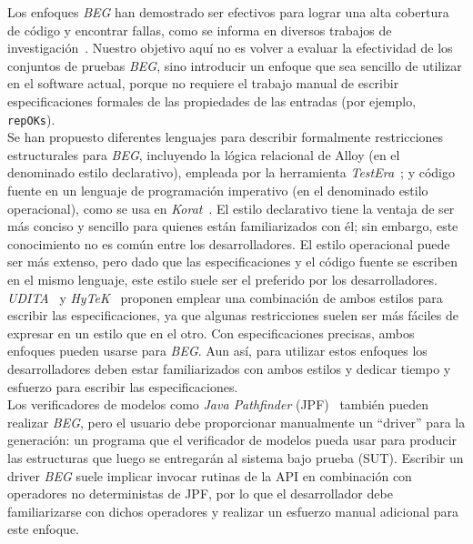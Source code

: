 Los enfoques \textit{BEG} han demostrado ser efectivos para lograr una alta cobertura 
de código y encontrar fallas, como se informa en diversos trabajos de investigación~\cite{ref20,ref16,ref4,ref33}. 
Nuestro objetivo aquí no es volver a evaluar la efectividad de los conjuntos de pruebas 
\textit{BEG}, sino introducir un enfoque que sea sencillo de utilizar en el software 
actual, porque no requiere el trabajo manual de escribir especificaciones formales de 
las propiedades de las entradas (por ejemplo, \texttt{repOKs}). \\

Se han propuesto diferentes lenguajes para describir formalmente restricciones 
estructurales para \textit{BEG}, incluyendo la lógica relacional de Alloy 
(en el denominado estilo declarativo), empleada por la herramienta \textit{TestEra}~\cite{ref20}; 
y código fuente en un lenguaje de programación imperativo (en el denominado estilo operacional), 
como se usa en \textit{Korat}~\cite{ref4}. El estilo declarativo tiene la ventaja de ser 
más conciso y sencillo para quienes están familiarizados con él; sin embargo, este conocimiento 
no es común entre los desarrolladores. El estilo operacional puede ser más extenso, pero 
dado que las especificaciones y el código fuente se escriben en el mismo lenguaje, este 
estilo suele ser el preferido por los desarrolladores. \\

\textit{UDITA}~\cite{ref11} y \textit{HyTeK}~\cite{ref29} proponen emplear una combinación de ambos estilos 
para escribir las especificaciones, ya que algunas restricciones suelen ser más fáciles de 
expresar en un estilo que en el otro. Con especificaciones precisas, ambos enfoques pueden 
usarse para \textit{BEG}. Aun así, para utilizar estos enfoques los desarrolladores deben 
estar familiarizados con ambos estilos y dedicar tiempo y esfuerzo para escribir las especificaciones. \\

Los verificadores de modelos como \textit{Java Pathfinder} (JPF)~\cite{ref34} también pueden realizar \textit{BEG}, 
pero el usuario debe proporcionar manualmente un “driver” para la generación: un programa 
que el verificador de modelos pueda usar para producir las estructuras que luego se entregarán 
al sistema bajo prueba (SUT). Escribir un driver \textit{BEG} suele implicar invocar rutinas de la API 
en combinación con operadores no deterministas de JPF, por lo que el desarrollador debe 
familiarizarse con dichos operadores y realizar un esfuerzo manual adicional para este enfoque. \\

